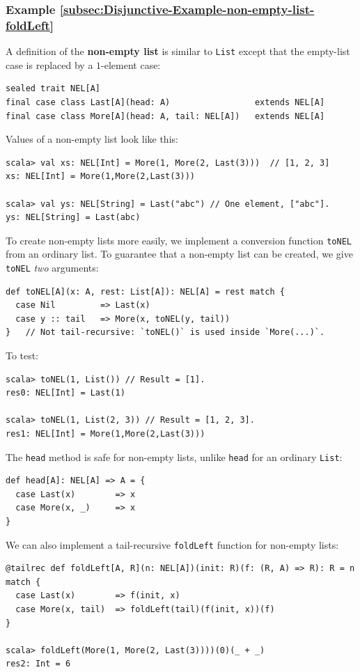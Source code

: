 \subsubsection{Example \label{subsec:Disjunctive-Example-non-empty-list-foldLeft}\ref{subsec:Disjunctive-Example-non-empty-list-foldLeft}}

A definition of the \textbf{non-empty list}
is similar to \lstinline!List! except that the empty-list case is
replaced by a $1$-element case:
\begin{lstlisting}
sealed trait NEL[A]
final case class Last[A](head: A)                 extends NEL[A]
final case class More[A](head: A, tail: NEL[A])   extends NEL[A]
\end{lstlisting}
Values of a non-empty list look like this:
\begin{lstlisting}
scala> val xs: NEL[Int] = More(1, More(2, Last(3)))  // [1, 2, 3]
xs: NEL[Int] = More(1,More(2,Last(3)))

scala> val ys: NEL[String] = Last("abc") // One element, ["abc"].
ys: NEL[String] = Last(abc)
\end{lstlisting}
To create non-empty lists more easily, we implement a conversion function
\lstinline!toNEL! from an ordinary list. To guarantee that a non-empty
list can be created, we give \lstinline!toNEL! \emph{two} arguments:
\begin{lstlisting}
def toNEL[A](x: A, rest: List[A]): NEL[A] = rest match {
  case Nil         => Last(x)
  case y :: tail   => More(x, toNEL(y, tail))
}   // Not tail-recursive: `toNEL()` is used inside `More(...)`.
\end{lstlisting}
To test:
\begin{lstlisting}
scala> toNEL(1, List()) // Result = [1].
res0: NEL[Int] = Last(1)

scala> toNEL(1, List(2, 3)) // Result = [1, 2, 3].
res1: NEL[Int] = More(1,More(2,Last(3)))
\end{lstlisting}

The \lstinline!head! method is safe for non-empty lists, unlike \lstinline!head!
for an ordinary \lstinline!List!:
\begin{lstlisting}
def head[A]: NEL[A] => A = {
  case Last(x)        => x
  case More(x, _)     => x
}
\end{lstlisting}

We can also implement a tail-recursive \lstinline!foldLeft! function
for non-empty lists:
\begin{lstlisting}
@tailrec def foldLeft[A, R](n: NEL[A])(init: R)(f: (R, A) => R): R = n match {
  case Last(x)        => f(init, x)
  case More(x, tail)  => foldLeft(tail)(f(init, x))(f)
}

scala> foldLeft(More(1, More(2, Last(3))))(0)(_ + _)
res2: Int = 6
\end{lstlisting}


